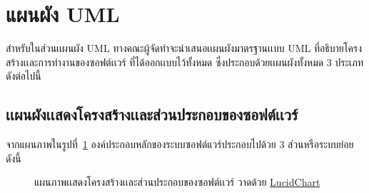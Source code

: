 \documentclass[12pt,one side,openright,a4paper]{cpe-thesis-th}
\newcommand{\thaijustify}[1]{%
  \par\hspace{30pt}\justifying
  #1
}
\begin{document}
\section{แผนผัง UML}
\thaijustify{
  สำหรับในส่วนเเผนผัง UML ทางคณะผู้จัดทำจะนำเสนอเเผนผังมาตรฐานเเบบ UML ที่อธิบายโครงสร้างเเละการทำงานของซอฟต์เเวร์ ที่ได้ออกเเบบไว้ทั้งหมด ซึ่งประกอบด้วยเเผนผังทั้งหมด 3 ประเภทดังต่อไปนี้
}
\subsection{เเผนผังเเสดงโครงสร้างเเละส่วนประกอบของซอฟต์เเวร์}
จากแผนภาพในรูปที่~\ref{fig:comp-diagram} องค์ประกอบหลักของระบบซอฟต์แวร์ประกอบไปด้วย 3 ส่วนหรือระบบย่อยดังนี้
\hypertarget{comp-diagram}{
  \begin{figure}[!h]
    \centering
    \caption[ภาพแผนผังเเสดงโครงสร้างเเละส่วนประกอบของซอฟต์เเวร์]{แผนภาพเเสดงโครงสร้างเเละส่วนประกอบของซอฟต์เเวร์ วาดด้วย \href{https://lucid.app/}{LucidChart}}
    \label{fig:comp-diagram}
  \end{figure}
}
\end{document}
